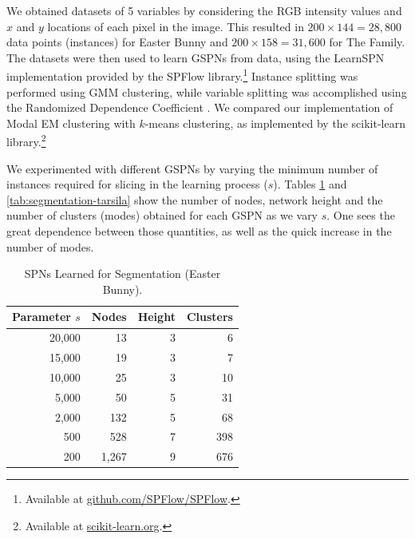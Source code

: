 \documentclass[accepted]{tpm2023} %
\begin{document}
We obtained datasets of 5 variables by considering the RGB intensity values and $x$ and $y$ locations of each pixel in the image.
This resulted in $200 \times 144 = 28,800$ data points (instances) for Easter Bunny and $200 \times 158 = 31,600$ for The Family.
%
The datasets were then used to learn GSPNs from data, using the LearnSPN implementation provided by the SPFlow library.\footnote{Available at \url{github.com/SPFlow/SPFlow}.} Instance splitting was performed using GMM clustering, while variable splitting was accomplished using the Randomized Dependence Coefficient \citep{Lopes-Paz2013}.
We compared our implementation of Modal EM clustering with $k$-means clustering, as implemented by the scikit-learn library.\footnote{Available at \url{scikit-learn.org}.}

We experimented with different GSPNs by varying the minimum number of instances required for slicing in the learning process ($s$).
Tables \ref{tab:segmentation-rabbit} and~ \ref{tab:segmentation-tarsila} show the number of nodes, network height and the number of clusters (modes) obtained for each GSPN as we vary $s$.
One sees the great dependence between those quantities, as well as the quick increase in the number of modes.

\begin{table}
  \centering
  \caption{SPNs Learned for Segmentation (Easter Bunny).}
  \label{tab:segmentation-rabbit}

  \begin{tabular}{rrrr}
    \toprule
    \bfseries Parameter $s$ & \bfseries Nodes & \bfseries Height & \bfseries Clusters \\ \midrule
    20,000                  & 13              & 3                & 6                  \\
    15,000                  & 19              & 3                & 7                  \\
    10,000                  & 25              & 3                & 10                 \\
    5,000                   & 50              & 5                & 31                 \\
    2,000                   & 132             & 5                & 68                 \\
    500                     & 528             & 7                & 398                \\
    200                     & 1,267           & 9                & 676                \\
    \bottomrule
  \end{tabular}
\end{table}
\end{document}
